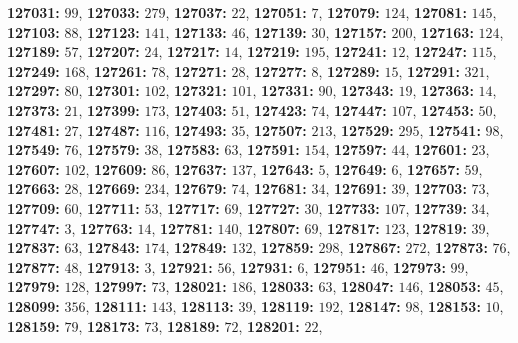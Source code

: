\textsf{\bfseries 127031:} $99$, \textsf{\bfseries 127033:} $279$, \textsf{\bfseries 127037:} $22$, \textsf{\bfseries 127051:} $7$, \textsf{\bfseries 127079:} $124$, \textsf{\bfseries 127081:} $145$, \textsf{\bfseries 127103:} $88$, \textsf{\bfseries 127123:} $141$, \textsf{\bfseries 127133:} $46$, \textsf{\bfseries 127139:} $30$, \textsf{\bfseries 127157:} $200$, \textsf{\bfseries 127163:} $124$, \textsf{\bfseries 127189:} $57$, \textsf{\bfseries 127207:} $24$, \textsf{\bfseries 127217:} $14$, \textsf{\bfseries 127219:} $195$, \textsf{\bfseries 127241:} $12$, \textsf{\bfseries 127247:} $115$, \textsf{\bfseries 127249:} $168$, \textsf{\bfseries 127261:} $78$, \textsf{\bfseries 127271:} $28$, \textsf{\bfseries 127277:} $8$, \textsf{\bfseries 127289:} $15$, \textsf{\bfseries 127291:} $321$, \textsf{\bfseries 127297:} $80$, \textsf{\bfseries 127301:} $102$, \textsf{\bfseries 127321:} $101$, \textsf{\bfseries 127331:} $90$, \textsf{\bfseries 127343:} $19$, \textsf{\bfseries 127363:} $14$, \textsf{\bfseries 127373:} $21$, \textsf{\bfseries 127399:} $173$, \textsf{\bfseries 127403:} $51$, \textsf{\bfseries 127423:} $74$, \textsf{\bfseries 127447:} $107$, \textsf{\bfseries 127453:} $50$, \textsf{\bfseries 127481:} $27$, \textsf{\bfseries 127487:} $116$, \textsf{\bfseries 127493:} $35$, \textsf{\bfseries 127507:} $213$, \textsf{\bfseries 127529:} $295$, \textsf{\bfseries 127541:} $98$, \textsf{\bfseries 127549:} $76$, \textsf{\bfseries 127579:} $38$, \textsf{\bfseries 127583:} $63$, \textsf{\bfseries 127591:} $154$, \textsf{\bfseries 127597:} $44$, \textsf{\bfseries 127601:} $23$, \textsf{\bfseries 127607:} $102$, \textsf{\bfseries 127609:} $86$, \textsf{\bfseries 127637:} $137$, \textsf{\bfseries 127643:} $5$, \textsf{\bfseries 127649:} $6$, \textsf{\bfseries 127657:} $59$, \textsf{\bfseries 127663:} $28$, \textsf{\bfseries 127669:} $234$, \textsf{\bfseries 127679:} $74$, \textsf{\bfseries 127681:} $34$, \textsf{\bfseries 127691:} $39$, \textsf{\bfseries 127703:} $73$, \textsf{\bfseries 127709:} $60$, \textsf{\bfseries 127711:} $53$, \textsf{\bfseries 127717:} $69$, \textsf{\bfseries 127727:} $30$, \textsf{\bfseries 127733:} $107$, \textsf{\bfseries 127739:} $34$, \textsf{\bfseries 127747:} $3$, \textsf{\bfseries 127763:} $14$, \textsf{\bfseries 127781:} $140$, \textsf{\bfseries 127807:} $69$, \textsf{\bfseries 127817:} $123$, \textsf{\bfseries 127819:} $39$, \textsf{\bfseries 127837:} $63$, \textsf{\bfseries 127843:} $174$, \textsf{\bfseries 127849:} $132$, \textsf{\bfseries 127859:} $298$, \textsf{\bfseries 127867:} $272$, \textsf{\bfseries 127873:} $76$, \textsf{\bfseries 127877:} $48$, \textsf{\bfseries 127913:} $3$, \textsf{\bfseries 127921:} $56$, \textsf{\bfseries 127931:} $6$, \textsf{\bfseries 127951:} $46$, \textsf{\bfseries 127973:} $99$, \textsf{\bfseries 127979:} $128$, \textsf{\bfseries 127997:} $73$, \textsf{\bfseries 128021:} $186$, \textsf{\bfseries 128033:} $63$, \textsf{\bfseries 128047:} $146$, \textsf{\bfseries 128053:} $45$, \textsf{\bfseries 128099:} $356$, \textsf{\bfseries 128111:} $143$, \textsf{\bfseries 128113:} $39$, \textsf{\bfseries 128119:} $192$, \textsf{\bfseries 128147:} $98$, \textsf{\bfseries 128153:} $10$, \textsf{\bfseries 128159:} $79$, \textsf{\bfseries 128173:} $73$, \textsf{\bfseries 128189:} $72$, \textsf{\bfseries 128201:} $22$, 
